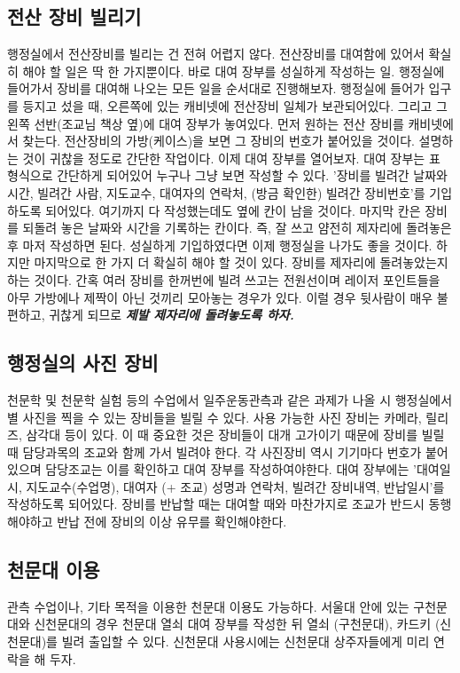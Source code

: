 \subsection{전산 장비 빌리기}
행정실에서 전산장비를 빌리는 건 전혀 어렵지 않다. 전산장비를 대여함에 있어서
확실히 해야 할 일은 딱 한 가지뿐이다. 바로 대여 장부를 성실하게 작성하는
일. 행정실에 들어가서 장비를 대여해 나오는 모든 일을 순서대로
진행해보자. 행정실에 들어가 입구를 등지고 섰을 때, 오른쪽에 있는 캐비넷에
전산장비 일체가 보관되어있다. 그리고 그 왼쪽 선반(조교님 책상 옆)에 대여 장부가
놓여있다. 먼저 원하는 전산 장비를 캐비넷에서 찾는다. 전산장비의 가방(케이스)을
보면 그 장비의 번호가 붙어있을 것이다. 설명하는 것이 귀찮을 정도로 간단한
작업이다. 이제 대여 장부를 열어보자. 대여 장부는 표 형식으로 간단하게 되어있어
누구나 그냥 보면 작성할 수 있다. '장비를 빌려간 날짜와 시간, 빌려간 사람,
지도교수, 대여자의 연락처, (방금 확인한) 빌려간 장비번호'를 기입하도록
되어있다. 여기까지 다 작성했는데도 옆에 칸이 남을 것이다. 마지막 칸은 장비를
되돌려 놓은 날짜와 시간을 기록하는 칸이다. 즉, 잘 쓰고 얌전히 제자리에 돌려놓은
후 마저 작성하면 된다. 성실하게 기입하였다면 이제 행정실을 나가도 좋을
것이다. 하지만 마지막으로 한 가지 더 확실히 해야 할 것이 있다. 장비를 제자리에
돌려놓았는지 하는 것이다. 간혹 여러 장비를 한꺼번에 빌려 쓰고는 전원선이며 레이저
포인트들을 아무 가방에나 제짝이 아닌 것끼리 모아놓는 경우가 있다. 이럴 경우
뒷사람이 매우 불편하고, 귀찮게 되므로 {\textbf{\emph{제발 제자리에 돌려놓도록
      하자.}}}

\subsection{행정실의 사진 장비}
천문학 및 천문학 실험 등의 수업에서 일주운동관측과 같은 과제가 나올 시 행정실에서
별 사진을 찍을 수 있는 장비들을 빌릴 수 있다. 사용 가능한 사진 장비는 카메라,
릴리즈, 삼각대 등이 있다. 이 때 중요한 것은 장비들이 대개 고가이기 때문에 장비를
빌릴 때 담당과목의 조교와 함께 가서 빌려야 한다. 각 사진장비 역시 기기마다 번호가
붙어있으며 담당조교는 이를 확인하고 대여 장부를 작성하여야한다. 대여 장부에는
'대여일시, 지도교수(수업명), 대여자 (+ 조교) 성명과 연락처, 빌려간 장비내역,
반납일시'를 작성하도록 되어있다. 장비를 반납할 때는 대여할 때와 마찬가지로 조교가
반드시 동행해야하고 반납 전에 장비의 이상 유무를 확인해야한다.

\subsection{천문대 이용}
관측 수업이나, 기타 목적을 이용한 천문대 이용도 가능하다. 서울대 안에 있는
구천문대와 신천문대의 경우 천문대 열쇠 대여 장부를 작성한 뒤 열쇠 (구천문대),
카드키 (신천문대)를 빌려 출입할 수 있다. 신천문대 사용시에는 신천문대
상주자들에게 미리 연락을 해 두자.

